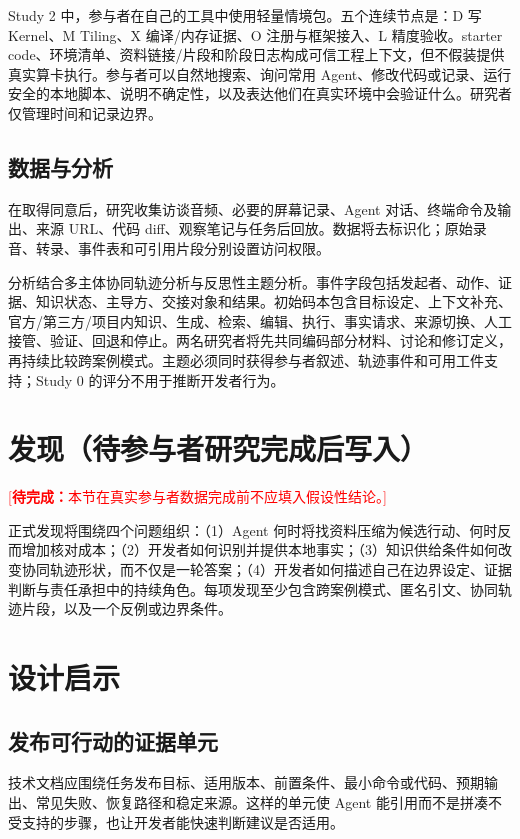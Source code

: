 \documentclass[manuscript,review,anonymous]{acmart}
\newcommand{\todo}[1]{\textcolor{red}{[\textbf{待完成：}#1]}}
\begin{document}
Study 2 中，参与者在自己的工具中使用轻量情境包。五个连续节点是：D 写 Kernel、M Tiling、X 编译/内存证据、O 注册与框架接入、L 精度验收。starter code、环境清单、资料链接/片段和阶段日志构成可信工程上下文，但不假装提供真实算卡执行。参与者可以自然地搜索、询问常用 Agent、修改代码或记录、运行安全的本地脚本、说明不确定性，以及表达他们在真实环境中会验证什么。研究者仅管理时间和记录边界。

\subsection{数据与分析}

在取得同意后，研究收集访谈音频、必要的屏幕记录、Agent 对话、终端命令及输出、来源 URL、代码 diff、观察笔记与任务后回放。数据将去标识化；原始录音、转录、事件表和可引用片段分别设置访问权限。

分析结合多主体协同轨迹分析与反思性主题分析。事件字段包括发起者、动作、证据、知识状态、主导方、交接对象和结果。初始码本包含目标设定、上下文补充、官方/第三方/项目内知识、生成、检索、编辑、执行、事实请求、来源切换、人工接管、验证、回退和停止。两名研究者将先共同编码部分材料、讨论和修订定义，再持续比较跨案例模式。主题必须同时获得参与者叙述、轨迹事件和可用工件支持；Study 0 的评分不用于推断开发者行为。

\section{发现（待参与者研究完成后写入）}

\todo{本节在真实参与者数据完成前不应填入假设性结论。}

正式发现将围绕四个问题组织：（1）Agent 何时将找资料压缩为候选行动、何时反而增加核对成本；（2）开发者如何识别并提供本地事实；（3）知识供给条件如何改变协同轨迹形状，而不仅是一轮答案；（4）开发者如何描述自己在边界设定、证据判断与责任承担中的持续角色。每项发现至少包含跨案例模式、匿名引文、协同轨迹片段，以及一个反例或边界条件。

\section{设计启示}

\subsection{发布可行动的证据单元}
技术文档应围绕任务发布目标、适用版本、前置条件、最小命令或代码、预期输出、常见失败、恢复路径和稳定来源。这样的单元使 Agent 能引用而不是拼凑不受支持的步骤，也让开发者能快速判断建议是否适用。
\end{document}
